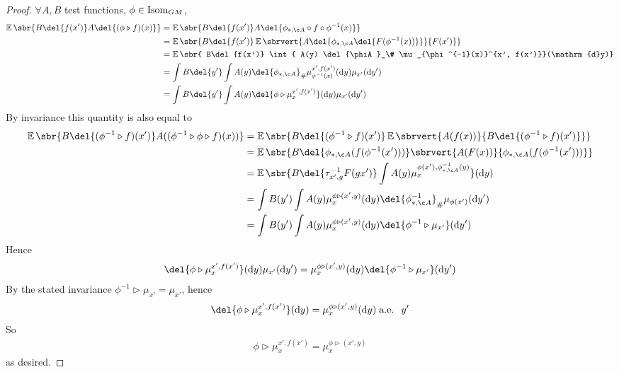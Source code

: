 \begin{proof} \(\forall A, B\) test functions, $\phi \in \operatorname{Isom}_{GM}$, \begin{align*} \E\sbr{B\del{f(x')}A\del{(\phi \triangleright f)(x)} } & = \E\sbr{ B\del{f(x')} A\del{{\phiA \circ f \circ \phi^{-1}}(x)}} \\ & = \E\sbr{ B\del{f(x')} \E\sbrvert{A\del{\phiA\del{F(\phi^{-1}(x))}}}{F(x')}} \\ & = \E\sbr{ B\del{f(x')} \int{ A(y) \del{\phiA}_\# \mu_{\phi^{-1}(x)}^{x', f(x')}}(\mathrm{d}y)} \\ & = \int{ B\del{y'} \int{ A(y) \del{\phiA}_\# \mu_{\phi^{-1}(x)}^{x', f(x')}}(\mathrm{d}y) \mu_{x'}(\mathrm{d}y')} \\ & = \int{ B\del{y'} \int{ A(y) \del{\phi \triangleright \mu_{x}^{x', f(x')}}}(\mathrm{d}y) \mu_{x'}(\mathrm{d}y')} \\ \end{align*} By invariance this quantity is also equal to \begin{align*} \E\sbr{B\del{(\phi^{-1}\triangleright f)(x')} A((\phi^{-1}\triangleright \phi \triangleright f)(x))} & = \E\sbr{B\del{(\phi^{-1}\triangleright f)(x')} \E\sbrvert{ A(f(x))}{B\del{(\phi^{-1}\triangleright f)(x')}}} \\ & = \E\sbr{B\del{\phiA (f(\phi^{-1}(x')))} \sbrvert{ A(F(x))}{\phiA (f(\phi^{-1}(x')))}} \\ & = \E\sbr{B\del{\tau_{x', g}^{-1} F(gx')} \int{ A(y) \mu_x^{\phi(x'), \phiA^{-1}(y)}}}(\mathrm{d}y) \\ & = \int{B(y')\int{ A(y) \mu_x^{\phi\triangleright (x', y)}}}(\mathrm{d}y) \del{\phiA^{-1}}_\# \mu_{\phi(x')}(\mathrm{d}y') \\ & = \int{B(y')\int{ A(y) \mu_x^{\phi\triangleright (x', y)}}}(\mathrm{d}y) \del{\phi^{-1} \triangleright \mu_{x'}}(\mathrm{d}y') \\ \end{align*} Hence \begin{align*} \del{\phi \triangleright \mu_{x}^{x', f(x')}}(\mathrm{d}y) \mu_{x'}(\mathrm{d}y') = \mu_x^{\phi\triangleright (x', y)}(\mathrm{d}y) \del{\phi^{-1} \triangleright \mu_{x'}}(\mathrm{d}y') \end{align*} By the stated invariance \( \phi^{-1} \triangleright \mu_{x'} = \mu_{x'}\), hence \begin{align*} \del{\phi \triangleright \mu_{x}^{x', f(x')}}(\mathrm{d}y) = \mu_x^{\phi\triangleright (x', y)}(\mathrm{d}y) \;\text{a.e.
		}\;y'
	\end{align*}
	So \begin{align} \phi \triangleright \mu_{x}^{x', f(x')} = \mu_x^{\phi\triangleright (x', y)} \end{align} as desired.
\end{proof}

